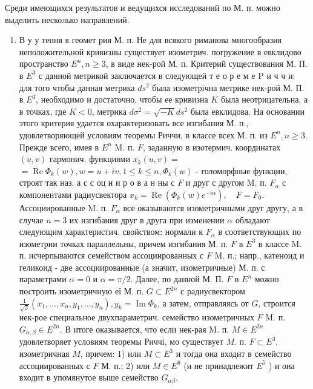 \documentclass[10pt]{article}
\begin{document}
Среди имеющихся результатов и ведущихся исследований по М. п. можно выделить несколько направлений.



\begin{enumerate}

  \item В у у тення я геомет рия М. п. Не для всякого риманова многообразия неположительной кривизны существует изометрич. погружение в евклидово пространство $E^{n}, n \geqslant 3$, в виде нек-рой М. п. Критерий существования М. П. в $E^{3}$ с данной метрикой заключается в следующей т е о р е м е $\mathrm{P}$ и ч ч и: для того чтобы данная метрика $d s^{2}$ была изометрічна метрике нек-рой М. П. в $E^{3}$, необходимо и достаточно, чтобы ее кривизна $K$ была неотрицательна, а в точках, где $K<0$, метрика $d \sigma^{2}=\sqrt{-K} d s^{2}$ была евклидова. На основании этого критерия удается охарактеризовать все изгибания М. п., удовлетворяющей условиям теоремы Риччи, в классе всех М. п. из $E^{n}, n \geqslant 3$. Прежде всего, имея в $E^{n}$ M. п. $F$, заданную в изотермич. координатах $(u, v)$ гармонич. функциями $x_{k}(u, v)=$ $=\operatorname{Re} \Phi_{k}(w), w=u+i v, 1 \leqslant k \leqslant n, \Phi_{k}(w)$ - голоморфные функции, строят так наз. а с с оц и и р о в а н ны с $F$ и друг с другом M. п. $F_{\alpha}$ с компонентами радиусвектора $x_{k}=\operatorname{Re}\left(\Phi_{k}(w) e^{-i \alpha}\right), \quad F=F_{0}$. Ассоциированные M. п. $F_{\alpha}$ все оказываются изометричными друг другу, а в случае $n=3$ их изгибания друг в друга при изменении $\alpha$ обладают следующим характеристич. свойством: нормали к $F_{\alpha}$ в соответствующих по изометрии точках параллельны, причем изгибания М. п. $F$ в $E^{3}$ в классе M. п. исчерпываются семейством ассоциированных с $F$ M. п.; напр., катеноид и геликоид - две ассоциированные (а значит, изометричные) М. п. с параметрами $\alpha=0$ и $\alpha=\pi / 2$. Далее, по данной М. П. $F$ в $E^{n}$ можно построить изометричную еї М. п. $G \subset E^{2 n}$ с радиусвектором $\frac{1}{\sqrt{2}}\left(x_{1}, \ldots, x_{n}, y_{1}, \ldots, y_{n}\right), y_{k}=\operatorname{Im} \Phi_{k}$, а затем, отправляясь от $G$, строится нек-рое специальное двухпараметрич. семейство изометричных $F$ M. п. $G_{\alpha, \beta} \in E^{2 n}$. В итоге оказывается, что если нек-рая M. п. $M \in E^{2 n}$ удовлетворяет условиям теоремы Риччі, мо существует $M$. п. $F \subset E^{3}$, изометричная $M$, причем: 1) или $M \subset E^{3}$ и тогда она входит в семейство ассоциированных с $F$ М. п.; 2) или $M \in E^{6}$ (и не принадлежит $E^{5}$ ) и она входит в упомянутое выше семейство $G_{\alpha \beta}$.

\end{enumerate}
\end{document}
